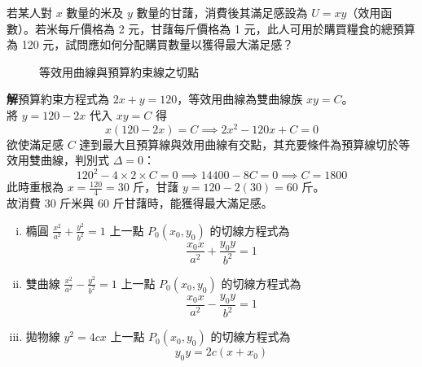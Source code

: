 \begin{example}
若某人對 $x$ 數量的米及 $y$ 數量的甘藷，消費後其滿足感設為 $U = xy$（效用函數）。若米每斤價格為 2 元，甘藷每斤價格為 1 元，此人可用於購買糧食的總預算為 120 元，試問應如何分配購買數量以獲得最大滿足感？

\begin{figure}[htbp]
\centering
{}
\caption{等效用曲線與預算約束線之切點}
\label{fig:b4s-3-30}
\end{figure}

\textbf{解}\quad 預算約束方程式為 $2x + y = 120$，等效用曲線為雙曲線族 $xy = C$。\\
將 $y = 120 - 2x$ 代入 $xy = C$ 得
\[ x(120 - 2x) = C \implies 2x^2 - 120x + C = 0 \]
欲使滿足感 $C$ 達到最大且預算線與效用曲線有交點，其充要條件為預算線切於等效用雙曲線，判別式 $\Delta = 0$：
\[ 120^2 - 4 \times 2 \times C = 0 \implies 14400 - 8C = 0 \implies C = 1800 \]
此時重根為 $x = \frac{120}{4} = 30$ 斤，甘藷 $y = 120 - 2(30) = 60$ 斤。\\
故消費 30 斤米與 60 斤甘藷時，能獲得最大滿足感。
\end{example}

\begin{theorem}[錐線上一點之切線方程式]
\begin{enumerate}[(i)]
  \item 橢圓 $\frac{x^2}{a^2} + \frac{y^2}{b^2} = 1$ 上一點 $P_0(x_0, y_0)$ 的切線方程式為
  \begin{equation}
  \frac{x_0 x}{a^2} + \frac{y_0 y}{b^2} = 1 \label{eq:b4s-3-4-tan-ellipse}
  \end{equation}
  \item 雙曲線 $\frac{x^2}{a^2} - \frac{y^2}{b^2} = 1$ 上一點 $P_0(x_0, y_0)$ 的切線方程式為
  \begin{equation}
  \frac{x_0 x}{a^2} - \frac{y_0 y}{b^2} = 1 \label{eq:b4s-3-4-tan-hyper}
  \end{equation}
  \item 拋物線 $y^2 = 4cx$ 上一點 $P_0(x_0, y_0)$ 的切線方程式為
  \begin{equation}
  y_0 y = 2c(x + x_0) \label{eq:b4s-3-4-tan-para}
  \end{equation}
\end{enumerate}
\end{theorem}

